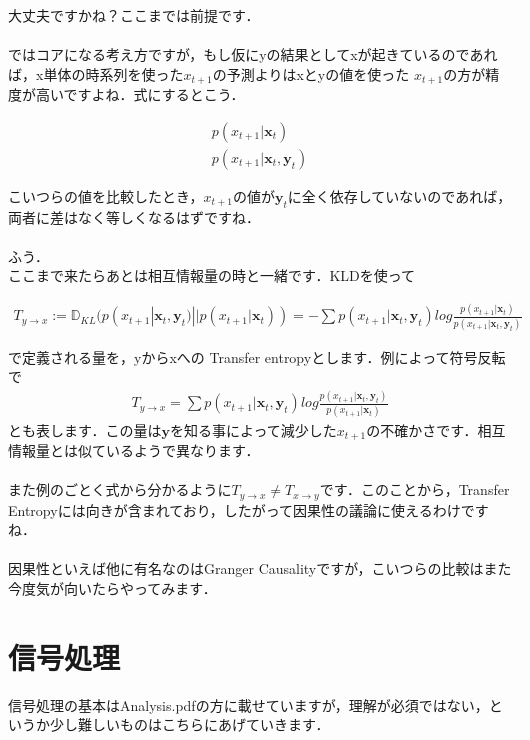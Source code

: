 \documentclass[11pt,a4paper,uplatex]{ujreport}
\begin{document}
大丈夫ですかね？ここまでは前提です．\\
\\

ではコアになる考え方ですが，もし仮にyの結果としてxが起きているのであれば，x単体の時系列を使った$x_{t+1}$の予測よりはxとyの値を使った $x_{t+1}$の方が精度が高いですよね．式にするとこう．

\begin{eqnarray}
\label{eq:TL1}
  p(x_{t+1}| \mathbf{x}_t) \nonumber \\
  p(x_{t+1}| \mathbf{x}_t, \mathbf{y}_t) \nonumber
\end{eqnarray}

こいつらの値を比較したとき，$x_{t+1}$の値が$\mathbf{y}_t$に全く依存していないのであれば，両者に差はなく等しくなるはずですね．\\
\\

ふう．
\\

ここまで来たらあとは相互情報量の時と一緒です．KLDを使って

\begin{eqnarray}
\label{eq:TE1}
  T_{y\rightarrow x} := \mathbb{D}_{KL}(p(x_{t+1}| \mathbf{x}_t, \mathbf{y}_t) || p(x_{t+1}| \mathbf{x}_t)) = -\sum p(x_{t+1}| \mathbf{x}_t, \mathbf{y}_t) log \frac{p(x_{t+1}| \mathbf{x}_t)}{p(x_{t+1}| \mathbf{x}_t, \mathbf{y}_t)} 
\end{eqnarray}

で定義される量を，yからxへの Transfer entropyとします．例によって符号反転で
\begin{eqnarray}
\label{eq:TE2}
  T_{y\rightarrow x} = \sum p(x_{t+1}| \mathbf{x}_t, \mathbf{y}_t) log \frac{p(x_{t+1}| \mathbf{x}_t, \mathbf{y}_t)}{p(x_{t+1}| \mathbf{x}_t)} 
\end{eqnarray}
とも表します．この量は$\mathbf{y}$を知る事によって減少した$x_{t+1}$の不確かさです．相互情報量とは似ているようで異なります．\\
\\

また例のごとく式から分かるように$T_{y\rightarrow x} \neq T_{x\rightarrow y}$です．このことから，Transfer Entropyには向きが含まれており，したがって因果性の議論に使えるわけですね\cite{kitano}．\\
\\

因果性といえば他に有名なのはGranger Causalityですが，こいつらの比較はまた今度気が向いたらやってみます．

\chapter{信号処理}
信号処理の基本はAnalysis.pdfの方に載せていますが，理解が必須ではない，というか少し難しいものはこちらにあげていきます．
\end{document}
